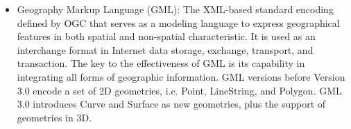 \documentclass[a4paper,12pt]{article}
\begin{document}
\begin{itemize}


\item Geography Markup Language (GML): The XML-based standard encoding defined by OGC that serves as a modeling language to express geographical features in both spatial and non-spatial characteristic. It is used as an interchange format in Internet data storage, exchange, transport, and transaction. The key to the effectiveness of GML is its capability in integrating all forms of geographic information. %
GML versions before Version 3.0 encode a set of 2D geometries, i.e. Point, LineString, and Polygon. GML 3.0 introduces Curve and Surface as new geometries, plus the support of geometries in 3D.


\end{itemize}
\end{document}
